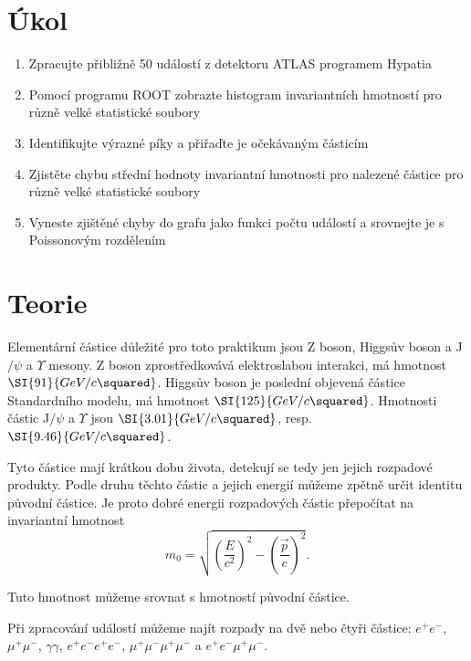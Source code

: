 \documentclass{protokol}
\begin{document}
  \section*{Úkol}

    \begin{enumerate}
      \item Zpracujte přibližně 50 událostí z detektoru ATLAS programem Hypatia
      \item Pomocí programu ROOT zobrazte histogram invariantních hmotností pro různě velké statistické soubory
      \item Identifikujte výrazné píky a přiřaďte je očekávaným částicím
      \item Zjistěte chybu střední hodnoty invariantní hmotnosti pro nalezené částice pro různě velké statistické soubory
      \item Vyneste zjištěné chyby do grafu jako funkci počtu událostí a srovnejte je s Poissonovým rozdělením 
    \end{enumerate}

  \section*{Teorie}

    Elementární částice důležité pro toto praktikum jsou Z boson, Higgsův boson a J$/\psi$ a $\Upsilon$ mesony. Z boson zprostředkovává elektroslabou interakci, má hmotnost $\SI{91}{GeV/c\squared}$. Higgsův boson je poslední objevená částice Standardního modelu, má hmotnost $\SI{125}{GeV/c\squared}$. Hmotnosti částic J$/\psi$ a $\Upsilon$ jsou $\SI{3.01}{GeV/c\squared}$, resp. $\SI{9.46}{GeV/c\squared}$.

    Tyto částice mají krátkou dobu života, detekují se tedy jen jejich rozpadové produkty. Podle druhu těchto částic a jejich energií můžeme zpětně určit identitu původní částice. Je proto dobré energii rozpadových částic přepočítat na invariantní hmotnost \cite{pokyny}
    \begin{equation}
      m_0 = \sqrt{ \left( \frac{ E }{ c^2 } \right)^2 - \left( \frac{ \vec{p} }{ c } \right)^2 }.
    \end{equation}
    
    Tuto hmotnost můžeme srovnat s hmotností původní částice.

    Při zpracování událostí můžeme najít rozpady na dvě nebo čtyři částice: $e^+ e^-$, $\mu^+ \mu^-$, $\gamma \gamma$, $e^+ e^- e^+ e^-$, $\mu^+ \mu^- \mu^+ \mu^-$ a $ e^+ e^- \mu^+ \mu^-$.
\end{document}
